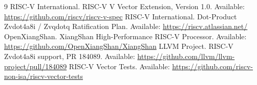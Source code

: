 \documentclass[11pt]{article}
\begin{document}
\begin{thebibliography}{9}
RISC-V International. RISC-V V Vector Extension, Version 1.0. Available: \url{https://github.com/riscv/riscv-v-spec}
RISC-V International. Dot-Product Zvdot4a8i / Zvqdotq Ratification Plan. Available: \url{https://riscv.atlassian.net/}
OpenXiangShan. XiangShan High-Performance RISC-V Processor. Available: \url{https://github.com/OpenXiangShan/XiangShan}
LLVM Project. RISC-V Zvdot4a8i support, PR 184089. Available: \url{https://github.com/llvm/llvm-project/pull/184089}
RISC-V Vector Tests. Available: \url{https://github.com/riscv-non-isa/riscv-vector-tests}
\end{thebibliography}
\end{document}

